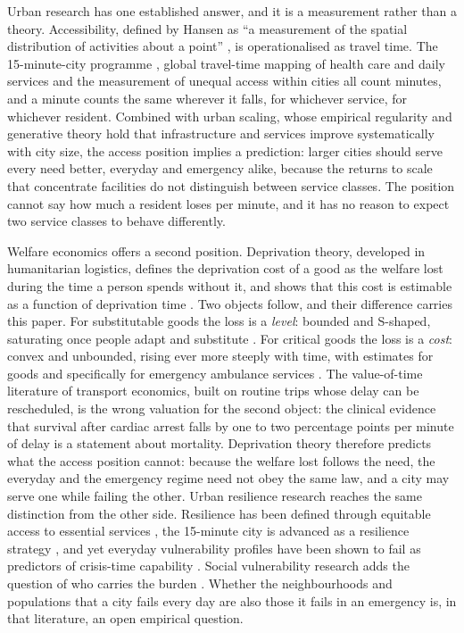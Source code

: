 \documentclass[11pt]{article}
\begin{document}
Urban research has one established answer, and it is a measurement rather
than a theory. Accessibility, defined by Hansen as ``a measurement of the
spatial distribution of activities about a point''
\citep{hansen1959accessibility}, is operationalised as travel time. The
15-minute-city programme \citep{moreno2021fifteenminute,papadopoulos2023compliance},
global travel-time mapping of health care and daily services
\citep{weiss2020healthcare,wu2025global} and the measurement of unequal
access within cities \citep{nicoletti2023disadvantaged} all count minutes,
and a minute counts the same wherever it falls, for whichever service, for
whichever resident. Combined with urban scaling, whose empirical
regularity \citep{bettencourt2007growth} and generative theory
\citep{bettencourt2013origins} hold that infrastructure and services
improve systematically with city size, the access position implies a
prediction: larger cities should serve every need better, everyday and
emergency alike, because the returns to scale that concentrate facilities
do not distinguish between service classes. The position cannot say how
much a resident loses per minute, and it has no reason to expect two
service classes to behave differently.

Welfare economics offers a second position. Deprivation theory, developed
in humanitarian logistics, defines the deprivation cost of a good as the
welfare lost during the time a person spends without it, and shows that
this cost is estimable as a function of deprivation time
\citep{holguinveras2013objective,holguinveras2016econometric}. Two objects
follow, and their difference carries this paper. For substitutable goods
the loss is a \emph{level}: bounded and S-shaped, saturating once people
adapt and substitute \citep{wang2017deprivation}. For critical goods the
loss is a \emph{cost}: convex and unbounded, rising ever more steeply with
time, with estimates for goods and specifically for emergency ambulance
services \citep{cantillo2018discrete,macea2018attitudes,delgadolindeman2019ambulance}.
The value-of-time literature of transport economics, built on routine
trips whose delay can be rescheduled, is the wrong valuation for the
second object: the clinical evidence that survival after cardiac arrest
falls by one to two percentage points per minute of delay
\citep{larsen1993survival,nicholl2007distance} is a statement about
mortality. Deprivation theory therefore predicts what the access position
cannot: because the welfare lost follows the need, the everyday and the
emergency regime need not obey the same law, and a city may serve one
while failing the other. Urban resilience research reaches the same
distinction from the other side. Resilience has been defined through
equitable access to essential services
\citep{meerow2016defining,logan2020reframing}, the 15-minute city is
advanced as a resilience strategy \citep{moreno2021fifteenminute}, and
yet everyday vulnerability profiles have been shown to fail as predictors
of crisis-time capability \citep{sirenko2026heatwaves}. Social
vulnerability research adds the question of who carries the burden
\citep{cutter2003vulnerability}. Whether the neighbourhoods and
populations that a city fails every day are also those it fails in an
emergency is, in that literature, an open empirical question.
\end{document}
